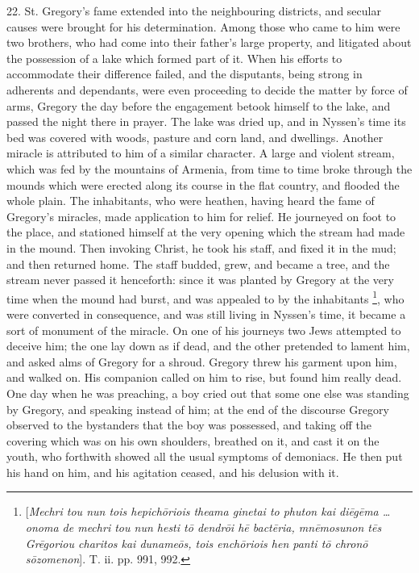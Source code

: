22.
St. Gregory's fame extended into the neighbouring districts, and
secular causes were brought for his determination. Among those who
came to him were two brothers, who had come into their father's large
property, and litigated about the possession of a lake which formed
part of it. When his efforts to accommodate their difference failed,
and the disputants, being strong in adherents and dependants, were
even proceeding to decide the matter by force of arms, Gregory the day
before the engagement betook himself to the lake, and passed the night
there in prayer. The lake was dried up, and in Nyssen's time its bed
was covered with woods, pasture and corn land, and dwellings. Another
miracle is attributed to him of a similar character. A large and
violent stream, which was fed by the mountains of Armenia, from time
to time broke through the mounds which were erected along its course
in the flat country, and flooded the whole plain. The inhabitants, who
were heathen, having heard the fame of Gregory's miracles, made
application to him for relief. He journeyed on foot to the place, and
stationed himself at the very opening which the stream had made in the
mound. Then invoking Christ, he took his staff, and fixed it in the
mud; and then returned home. The staff budded, grew, and became a
tree, and the stream never passed it henceforth: since it was
planted by Gregory at the very time when the mound had burst, and was
appealed to by the inhabitants \footnote{[\emph{Mechri tou nun tois hepich\={o}riois
theama ginetai to phuton kai di\={e}g\={e}ma … onoma de mechri
tou nun hesti t\={o} dendr\={o}i h\={e} bact\={e}ria, mn\={e}mosunon
t\={e}s Gr\={e}goriou charitos kai duname\={o}s, tois ench\={o}riois
hen panti t\={o} chron\={o} s\={o}zomenon}]. T. ii. pp.
991, 992.}, who were converted in
consequence, and was still living in Nyssen's time, it became a sort
of monument of the miracle. On one of his journeys two Jews attempted
to deceive him; the one lay down as if dead, and the other pretended
to lament him, and asked alms of Gregory for a shroud. Gregory threw
his garment upon him, and walked on. His companion called on him to
rise, but found him really dead. One day when he was preaching, a boy
cried out that some one else was standing by Gregory, and speaking
instead of him; at the end of the discourse Gregory observed to the
bystanders that the boy was possessed, and taking off the covering
which was on his own shoulders, breathed on it, and cast it on the
youth, who forthwith showed all the usual symptoms of demoniacs. He
then put his hand on him, and his agitation ceased, and his delusion
with it.

